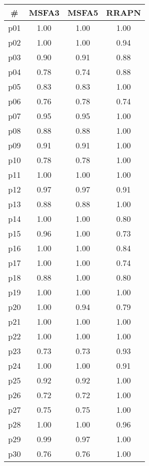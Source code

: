\begin{tabular}{cccc}
\toprule
\textbf{\#} & \textbf{MSFA3} & \textbf{MSFA5} & \textbf{RRAPN}\\
\midrule
p01 & 1.00 & 1.00 & 1.00\\
p02 & 1.00 & 1.00 & 0.94\\
p03 & 0.90 & 0.91 & 0.88\\
p04 & 0.78 & 0.74 & 0.88\\
p05 & 0.83 & 0.83 & 1.00\\
p06 & 0.76 & 0.78 & 0.74\\
p07 & 0.95 & 0.95 & 1.00\\
p08 & 0.88 & 0.88 & 1.00\\
p09 & 0.91 & 0.91 & 1.00\\
p10 & 0.78 & 0.78 & 1.00\\
p11 & 1.00 & 1.00 & 1.00\\
p12 & 0.97 & 0.97 & 0.91\\
p13 & 0.88 & 0.88 & 1.00\\
p14 & 1.00 & 1.00 & 0.80\\
p15 & 0.96 & 1.00 & 0.73\\
p16 & 1.00 & 1.00 & 0.84\\
p17 & 1.00 & 1.00 & 0.74\\
p18 & 0.88 & 1.00 & 0.80\\
p19 & 1.00 & 1.00 & 1.00\\
p20 & 1.00 & 0.94 & 0.79\\
p21 & 1.00 & 1.00 & 1.00\\
p22 & 1.00 & 1.00 & 1.00\\
p23 & 0.73 & 0.73 & 0.93\\
p24 & 1.00 & 1.00 & 0.91\\
p25 & 0.92 & 0.92 & 1.00\\
p26 & 0.72 & 0.72 & 1.00\\
p27 & 0.75 & 0.75 & 1.00\\
p28 & 1.00 & 1.00 & 0.96\\
p29 & 0.99 & 0.97 & 1.00\\
p30 & 0.76 & 0.76 & 1.00\\
\bottomrule
\end{tabular}

